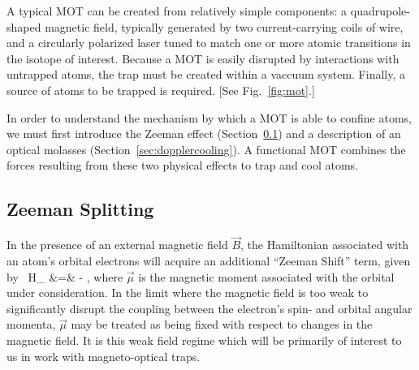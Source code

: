 
A typical MOT can be created from relatively simple components:  a quadrupole-shaped magnetic field, typically generated by two current-carrying coils of wire, and a circularly polarized laser tuned to match one or more atomic transitions in the isotope of interest.  Because a MOT is easily disrupted by interactions with untrapped atoms, the trap must be created within a vaccuum system.  Finally, a source of atoms to be trapped is required.  [See Fig.~\ref{fig:mot}.]

In order to understand the mechanism by which a MOT is able to confine atoms, we must first introduce the Zeeman effect (Section~\ref{sec:zeemansplitting}) and a description of an optical molasses (Section~\ref{sec:dopplercooling}). A functional MOT combines the forces resulting from these two physical effects to trap and cool atoms.




\subsection{Zeeman Splitting}
\label{sec:zeemansplitting}
In the presence of an external magnetic field $\vec{B}$, the Hamiltonian associated with an atom's orbital electrons will acquire an additional ``Zeeman Shift'' term, given by~\cite{corney}
\bea
\label{zeeman_hamiltonian}
H_{} &=& - \vec{\mu}\cdot {},
\eea
where $\vec{\mu}$ is the magnetic moment associated with the orbital under consideration.  In the limit where the magnetic field is too weak to significantly disrupt the coupling between the electron's spin- and orbital angular momenta, $\vec{\mu}$ may be treated as being fixed with respect to changes in the magnetic field.  It is this weak field regime which will be primarily of interest to us in work with magneto-optical traps.


